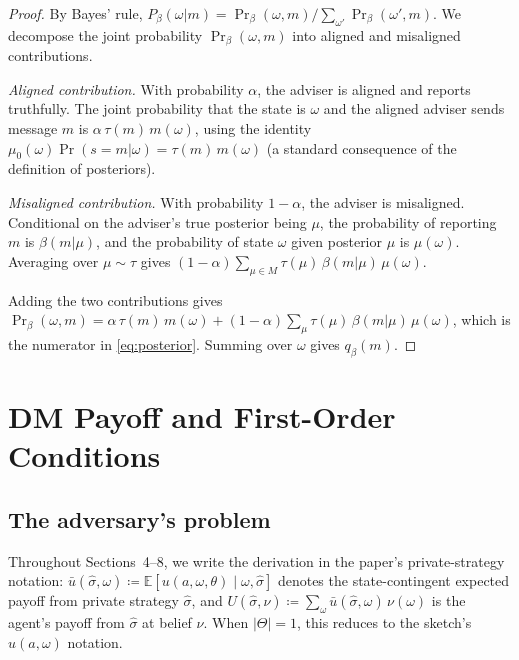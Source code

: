 \documentclass[12pt]{article}
\newcommand{\E}{\mathbb{E}}
\begin{document}
\begin{proof}
By Bayes' rule, $P_\beta(\omega|m) = \Pr_\beta(\omega,m) / \sum_{\omega'} \Pr_\beta(\omega',m)$. We decompose the joint probability $\Pr_\beta(\omega,m)$ into aligned and misaligned contributions.

\emph{Aligned contribution.} With probability $\alpha$, the adviser is aligned and reports truthfully. The joint probability that the state is $\omega$ and the aligned adviser sends message $m$ is $\alpha\,\tau(m)\,m(\omega)$, using the identity $\mu_0(\omega)\Pr(s=m|\omega) = \tau(m)\,m(\omega)$ (a standard consequence of the definition of posteriors).

\emph{Misaligned contribution.} With probability $1-\alpha$, the adviser is misaligned. Conditional on the adviser's true posterior being $\mu$, the probability of reporting $m$ is $\beta(m|\mu)$, and the probability of state $\omega$ given posterior $\mu$ is $\mu(\omega)$. Averaging over $\mu \sim \tau$ gives $(1-\alpha)\sum_{\mu \in M} \tau(\mu)\,\beta(m|\mu)\,\mu(\omega)$.

Adding the two contributions gives $\Pr_\beta(\omega,m) = \alpha\,\tau(m)\,m(\omega) + (1-\alpha)\sum_\mu \tau(\mu)\,\beta(m|\mu)\,\mu(\omega)$, which is the numerator in \eqref{eq:posterior}. Summing over $\omega$ gives $q_\beta(m)$.
\end{proof}

\section{DM Payoff and First-Order Conditions}
\label{sec:foc}

\subsection{The adversary's problem}

Throughout Sections~4--8, we write the derivation in the paper's private-strategy notation: $\bar{u}(\hat\sigma,\omega) \coloneqq \E[u(a,\omega,\theta) \mid \omega, \hat\sigma]$ denotes the state-contingent expected payoff from private strategy $\hat\sigma$, and $U(\hat\sigma,\nu) \coloneqq \sum_\omega \bar{u}(\hat\sigma,\omega)\,\nu(\omega)$ is the agent's payoff from $\hat\sigma$ at belief $\nu$. When $|\Theta|=1$, this reduces to the sketch's $u(a,\omega)$ notation.
\end{document}

